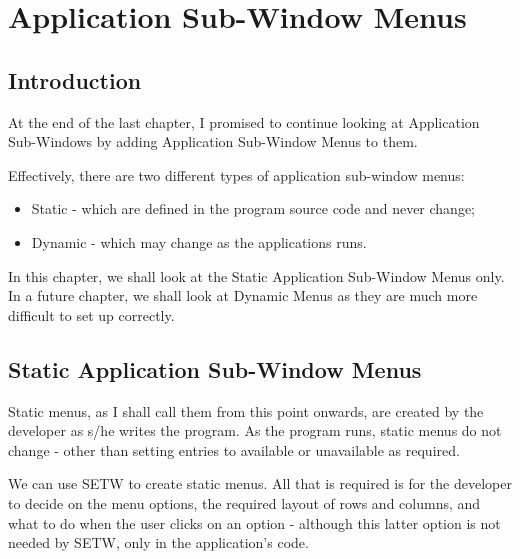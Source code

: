 \chapter{Application Sub-{}Window Menus}

\section{Introduction}
\label{ch29-intro}%

At the end of the last chapter, I promised to continue looking at
    Application Sub-{}Windows by adding Application Sub-{}Window Menus to them.

Effectively, there are two different types of application sub-{}window
    menus:
\begin{itemize}[itemsep=0pt]

\item{}Static -{} which are defined in the program source code and never
        change;

\item{}Dynamic -{} which may change as the applications runs.

\end{itemize}

In this chapter, we shall look at the Static Application Sub-{}Window
    Menus only. In a future chapter, we shall look at Dynamic Menus as they are much more difficult to set up correctly.

\section{Static Application Sub-{}Window Menus}
\label{ch29-app-menu-static}%

Static menus, as I shall call them from this point onwards, are
    created by the developer as s/he writes the program. As the program runs,
    static menus do not change -{} other than setting entries to available or
    unavailable as required.

We can use SETW to create static menus.
    All that is required is for the developer to decide on the menu options,
    the required layout of rows and columns, and what to do when the user
    clicks on an option -{} although this latter option is not needed by
 SETW, only in the application's code.


